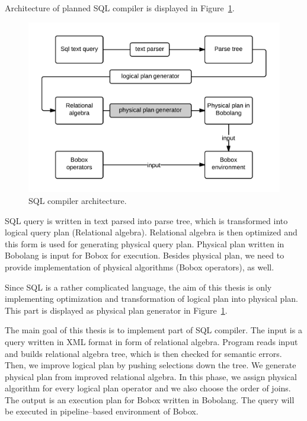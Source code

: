 Architecture of planned SQL compiler is displayed in Figure~\ref{fig:sqlarchitecture}. 
\begin{figure}[h!]
  \centering

    \includegraphics[width=1\textwidth]{sqlarchitecture}
    
      \caption{SQL compiler architecture.}
        \label{fig:sqlarchitecture}
\end{figure}
SQL query is written in text parsed into parse tree, which is transformed into logical query plan (Relational algebra). Relational algebra is then optimized and this form is used for generating physical query plan. Physical plan written in Bobolang is input for Bobox for execution. Besides physical plan, we need to provide implementation of physical algorithms (Bobox operators), as well.

Since SQL is a rather complicated language, the aim of this thesis is only implementing optimization and transformation of logical plan into physical plan. This part is displayed as physical plan generator in Figure~\ref{fig:sqlarchitecture}.


The main goal of this thesis is to implement part of SQL compiler. The input is a  query written in XML format in form of relational algebra. Program reads input and builds relational algebra tree, which is then checked for semantic errors. Then, we improve logical plan by pushing selections down the tree. We generate physical plan from improved relational algebra. In this phase, we assign physical algorithm for every logical plan operator and we also choose the order of joins. The output is an execution plan for Bobox written in Bobolang. The query will be executed in pipeline--based environment\cite{pipeline,distributedstream} of Bobox.
